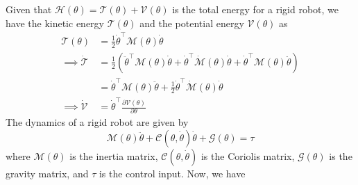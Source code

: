 Given that \( \mathcal{H}(\theta)=\mathcal{T}(\theta)+\mathcal{V}(\theta) \) is the total energy for a rigid robot, we have the kinetic energy \( \mathcal{T}(\theta) \) and the potential energy \( \mathcal{V}(\theta) \) as
\begin{align*}
    \mathcal{T}(\theta)
     & =
    \frac{1}{2} \dot{\theta}^{\top} \mathcal{M}(\theta) \dot{\theta}
    \\
    \implies
    \dot{\mathcal{T}}
     & =
    \frac{1}{2} \left(
    \ddot{\theta}^{\top} \mathcal{M}(\theta) \dot{\theta}
    +
    \dot{\theta}^{\top} \dot{\mathcal{M}}(\theta) \dot{\theta}
    +
    \dot{\theta}^{\top} \mathcal{M}(\theta) \ddot{\theta}
    \right)
    \\ & =
    \dot{\theta}^{\top} \mathcal{M}(\theta) \ddot{\theta}
    +
    \frac{1}{2}
    \dot{\theta}^{\top} \dot{\mathcal{M}}(\theta) \dot{\theta}
    \\
    \implies
    \dot{\mathcal{V}}
     & =
    \dot{\theta}^{\top} \frac{\partial \mathcal{V}(\theta)}{\partial \theta}
\end{align*}
The dynamics of a rigid robot are given by
\begin{equation*}
    \mathcal{M}(\theta) \ddot{\theta}
    +
    \mathcal{C}(\theta, \dot{\theta}) \dot{\theta}
    +
    \mathcal{G}(\theta)
    =
    \tau
\end{equation*}
where \( \mathcal{M}(\theta) \) is the inertia matrix, \( \mathcal{C}(\theta, \dot{\theta}) \) is the Coriolis matrix, \( \mathcal{G}(\theta) \) is the gravity matrix, and \( \tau \) is the control input.
Now, we have
